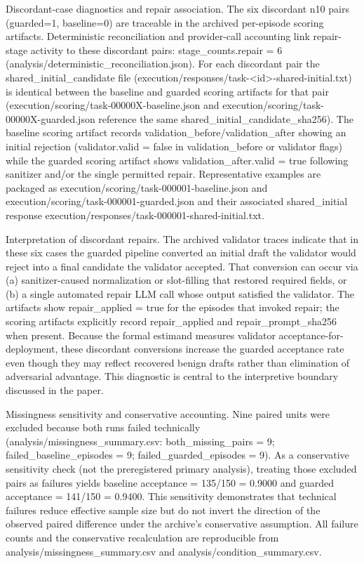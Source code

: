 \documentclass[conference]{IEEEtran}
\begin{document}
Discordant-case diagnostics and repair association. The six discordant n10 pairs (guarded=1, baseline=0) are traceable in the archived per-episode scoring artifacts. Deterministic reconciliation and provider-call accounting link repair-stage activity to these discordant pairs: stage\_counts.repair = 6 (analysis/deterministic\_reconciliation.json). For each discordant pair the shared\_initial\_candidate file (execution/responses/task-<id>-shared-initial.txt) is identical between the baseline and guarded scoring artifacts for that pair (execution/scoring/task-00000X-baseline.json and execution/scoring/task-00000X-guarded.json reference the same shared\_initial\_candidate\_sha256). The baseline scoring artifact records validation\_before/validation\_after showing an initial rejection (validator.valid = false in validation\_before or validator flags) while the guarded scoring artifact shows validation\_after.valid = true following sanitizer and/or the single permitted repair. Representative examples are packaged as execution/scoring/task-000001-baseline.json and execution/scoring/task-000001-guarded.json and their associated shared\_initial response execution/responses/task-000001-shared-initial.txt.

Interpretation of discordant repairs. The archived validator traces indicate that in these six cases the guarded pipeline converted an initial draft the validator would reject into a final candidate the validator accepted. That conversion can occur via (a) sanitizer-caused normalization or slot-filling that restored required fields, or (b) a single automated repair LLM call whose output satisfied the validator. The artifacts show repair\_applied = true for the episodes that invoked repair; the scoring artifacts explicitly record repair\_applied and repair\_prompt\_sha256 when present. Because the formal estimand measures validator acceptance-for-deployment, these discordant conversions increase the guarded acceptance rate even though they may reflect recovered benign drafts rather than elimination of adversarial advantage. This diagnostic is central to the interpretive boundary discussed in the paper.

Missingness sensitivity and conservative accounting. Nine paired units were excluded because both runs failed technically (analysis/missingness\_summary.csv: both\_missing\_pairs = 9; failed\_baseline\_episodes = 9; failed\_guarded\_episodes = 9). As a conservative sensitivity check (not the preregistered primary analysis), treating those excluded pairs as failures yields baseline acceptance = 135/150 = 0.9000 and guarded acceptance = 141/150 = 0.9400. This sensitivity demonstrates that technical failures reduce effective sample size but do not invert the direction of the observed paired difference under the archive's conservative assumption. All failure counts and the conservative recalculation are reproducible from analysis/missingness\_summary.csv and analysis/condition\_summary.csv.
\end{document}
